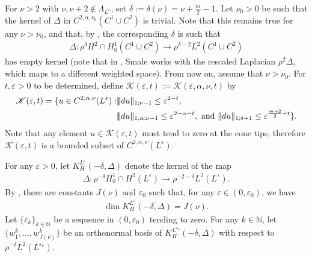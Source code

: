 \documentclass[11pt]{amsart}
\DeclarePairedDelimiter{\tnorm}{\vert\!\vert\!\vert}{\vert\!\vert\!\vert}
\theoremstyle{definition}
\theoremstyle{remark}
\begin{document}
For $\nu >2$ with $\nu,\nu+2  \notin \Lambda_{L^\varepsilon}$, set $\delta := \delta(\nu)=\nu+\frac{m}{2}-1$.
Let $\nu_0>0$ be such that the kernel of $\Delta$ in $C^{2,\alpha,\nu_0}(C^1\cup C^2)$ is trivial. Note that this remains true for any $\nu>\nu_0$, and that, by \cite[Lemma 2.2]{Sm93}, the corresponding $\delta$ is such that
\begin{align*}
    \Delta: \rho^\delta H^2\cap H^1_0(C^1\cup C^2)\to \rho^{\delta-2}L^2(C^1\cup C^2)
\end{align*}
has empty kernel (note that in \cite{Sm93}, Smale works with the rescaled Laplacian $\rho^2\Delta$, which maps to a different weighted space). From now on, assume that $\nu>\nu_0$.
For $t,\varepsilon>0$ to be determined, define $\mathscr{K}(\varepsilon,t) := \mathscr{K}(\varepsilon, \alpha, \nu, t)$ by
\begin{align}
    \mathscr{K}(\varepsilon, t) = \{u \in  C^{2,\alpha, \nu}(L^\varepsilon) : &\tnorm{du}_{1;\nu- 1} \leq \varepsilon^{2  - t} \label{Kepsilon}, \\
    &\tnorm{du}_{1, \alpha; \nu - 1} \leq \varepsilon^{2 - \alpha - t}, \text{ and } \lVert du\rVert_{1; \delta+1}\leq \varepsilon^{\frac{m+2}{2}-t} \}. \nonumber
\end{align}
Note that any element $u\in \mathscr{K}(\varepsilon, t)$ must tend to zero at the cone tips, therefore $\mathscr{K}(\varepsilon, t)$ is a bounded subset of $C^{2,\alpha,\nu}(L^\varepsilon)$.

For any $\varepsilon>0$, let $K_H^{L^\varepsilon}(-\delta,\Delta)$ denote the kernel of the map
\begin{align*}
    \Delta: \rho^{-\delta}  H^1_0\cap  H^2(L^\varepsilon)\to \rho^{-2-\delta} L^2(L^\varepsilon).
\end{align*}
By \cite[Lemma 4.2]{Sm93}, there are constants $J(\nu)$ and $\varepsilon_0$ such that, for any $\varepsilon\in (0,\varepsilon_0)$, we have
\begin{align*}
    \dim K_H^{L^\varepsilon}(-\delta,\Delta)=J(\nu).
\end{align*}
Let $\{\varepsilon_k\}_{k\in \mathbb{N}}$ be a sequence in $(0,\varepsilon_0)$ tending to zero.
For any $k\in \mathbb{N}$, let $\{w_1^k, ..., w_{J(\nu)}^k\}$ be an orthonormal basis of $K_H^{L^{\varepsilon_k}}(-\delta,\Delta)$ with respect to $\rho^{-\delta} L^2(L^{\varepsilon_k})$.
\end{document}
